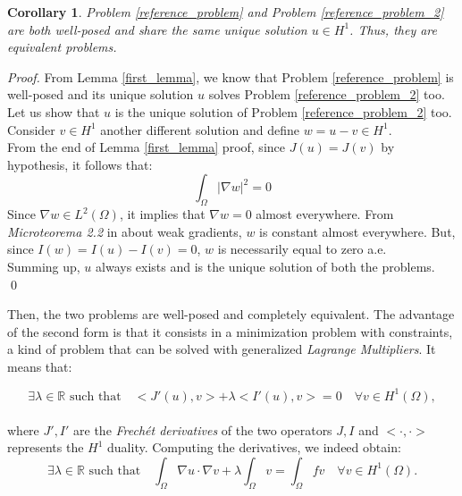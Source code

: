 \documentclass[a4paper,11pt]{article}
\newtheorem{corollary}{Corollary}
\begin{document}
\begin{corollary}
	Problem \ref{reference_problem} and Problem \ref{reference_problem_2} are both well-posed and share the same unique solution $u \in H^1$. Thus, they are equivalent problems.
\end{corollary}
\begin{proof}
	From Lemma \ref{first_lemma}, we know that Problem \ref{reference_problem} is well-posed and its unique solution $u$ solves Problem \ref{reference_problem_2} too. Let us show that $u$ is the unique solution of Problem \ref{reference_problem_2} too. Consider $v \in H^1$ another different solution and define $w=u-v \in H^1$. \\
	From the end of Lemma \ref{first_lemma} proof, since $J(u)=J(v)$ by hypothesis, it follows that:
	\begin{equation*}
	\int_{\Omega} | \nabla w | ^2 = 0
	\end{equation*}
	Since $\nabla w \in L^2(\Omega)$, it implies that $\nabla w = 0$ almost everywhere. From \emph{Microteorema 2.2} in \cite{salsa} about weak gradients, $w$ is constant almost everywhere. But, since $I(w)=I(u)-I(v)=0$, $w$ is necessarily equal to zero a.e. \\
	Summing up, $u$ always exists and is the unique solution of both the problems. \\ \qed
\end{proof} \vspace{4mm} 
\noindent Then, the two problems are well-posed and completely equivalent. The advantage of the second form is that it consists in a minimization problem with constraints, a kind of problem that can be solved with generalized \emph{Lagrange Multipliers}. It means that:

\begin{equation*}
\exists \lambda \in \mathbb{R} \text{ such that} \quad <J'(u),v>+\lambda <I'(u),v>=0 \quad \forall v \in H^1(\Omega),
\end{equation*}\\
\noindent where $J',I'$ are the \emph{Frechét derivatives} of the two operators $J,I$ and $<\cdot,\cdot>$ represents the $H^1$ duality. Computing the derivatives, we indeed obtain:
\begin{equation*}
\exists \lambda \in \mathbb{R} \text{ such that} \quad \int_{\Omega}\nabla u \cdot \nabla v + \lambda \int_\Omega v = \int_{\Omega} fv \quad \forall v \in H^1(\Omega).
\end{equation*}\\
\end{document}
